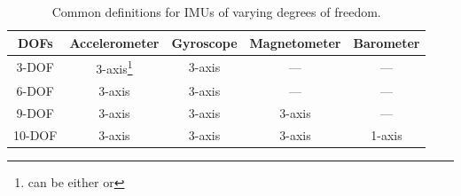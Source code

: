 \begin{table}[h]
    \caption{Common definitions for IMUs of varying degrees of freedom.}
    \label{tab:imu_dofs}
    \centering
    \begin{tabular}{| c | c | c | c | c |}
        \hline
        DOFs & Accelerometer & Gyroscope & Magnetometer & Barometer \\
        \hline
        3-DOF & 3-axis\footnote[2]{can be either or} & 3-axis\footnote[2] & --- & --- \\
        6-DOF & 3-axis & 3-axis & --- & --- \\
        9-DOF & 3-axis & 3-axis & 3-axis & --- \\
        10-DOF & 3-axis & 3-axis & 3-axis & 1-axis \\
        \hline
    \end{tabular}
\end{table}

